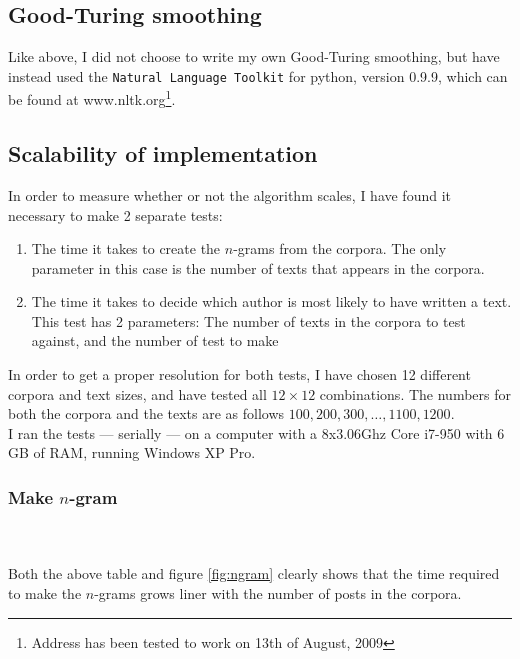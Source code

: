 \subsection{Good-Turing smoothing}
Like above, I did not choose to write my own Good-Turing smoothing, but have instead used the \texttt{Natural Language Toolkit} for python, version 0.9.9, which can be found at www.nltk.org\footnote{Address has been tested to work on 13th of August, 2009}.

\subsection{Scalability of implementation}
In order to measure whether or not the algorithm scales, I have found it necessary to make 2 separate tests: 
\begin{enumerate}
\item The time it takes to create the $n$-grams from the corpora. The only parameter in this case is the number of texts that appears in the corpora.
\item The time it takes to decide which author is most likely to have written a text. This test has 2 parameters: The number of texts in the corpora to test against, and the number of test to make
\end{enumerate}

In order to get a proper resolution for both tests, I have chosen 12 different corpora and text sizes, and have tested all $12 \times 12$ combinations. The numbers for both the corpora and the texts are as follows $100, 200, 300, \ldots, 1100, 1200$.\\

I ran the tests --- serially --- on a computer with a 8x3.06Ghz Core i7-950 with 6 GB of RAM, running Windows XP Pro. 

\subsubsection{Make $n$-gram}
\\ \\

Both the above table and figure \ref{fig:ngram} clearly shows that the time required to make the $n$-grams grows liner with the number of posts in the corpora.


